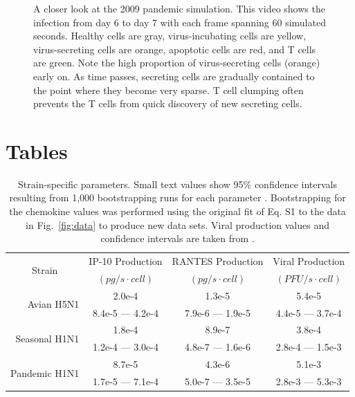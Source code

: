 \documentclass[10pt]{article}
\begin{document}
\begin{figure}[ht!]
\caption{A closer look at the 2009 pandemic simulation.  This video shows the infection from day 6 to day 7 with each frame spanning 60 simulated seconds.  Healthy cells are gray, virus-incubating cells are yellow, virus-secreting cells are orange, apoptotic cells are red, and T cells are green.  Note the high proportion of virus-secreting cells (orange) early on.  As time passes, secreting cells are gradually contained to the point where they become very sparse.  T cell clumping often prevents the T cells from quick discovery of new secreting cells.}
\end{figure}

\pagebreak

\section*{Tables}


\begin{table}
\centering
\begin{tabular}{ | r | c | c | c | }
  \hline                        
  \multicolumn{1}{|c|}{\multirow{2}{*}{Strain}} & IP-10 Production & RANTES Production & Viral Production \\
   & \footnotesize{$(pg/s\cdot cell)$}  & \footnotesize{$(pg/s\cdot cell)$} &  \footnotesize{$(PFU/s\cdot cell)$} \\
  \hline
  \multirow{2}{*}{Avian H5N1} & 2.0e-4 &  1.3e-5 & 5.4e-5 \\
   &  \footnotesize{8.4e-5 --- 4.2e-4} & \footnotesize{7.9e-6 --- 1.9e-5} & \footnotesize{4.4e-5 --- 3.7e-4}\\ 
   \hline
  \multirow{2}{*}{Seasonal H1N1} & 1.8e-4 &  8.9e-7 & 3.8e-4 \\
   & \footnotesize{1.2e-4 --- 3.0e-4} & \footnotesize{4.8e-7 --- 1.6e-6} & \footnotesize{2.8e-4 --- 1.5e-3}\\
   \hline
  \multirow{2}{*}{Pandemic H1N1} & 8.7e-5 &  4.3e-6 & 5.1e-3 \\
   & \footnotesize{1.7e-5 --- 7.1e-4} & \footnotesize{5.0e-7 --- 3.5e-5} & \footnotesize{2.8e-3 --- 5.3e-3} \\
  \hline
\end{tabular}
\caption{Strain-specific parameters.  Small text values show 95\% confidence intervals resulting from 1,000 bootstrapping runs for each parameter \cite{Wu1986}.  Bootstrapping for the chemokine values was performed using the original fit of Eq. S1 to the data in Fig.~\ref{fig:data} to produce new data sets.  Viral production values and confidence intervals are taken from \cite{Mitchell2011}.}
\label{tab:strains}
\end{table}
\end{document}
